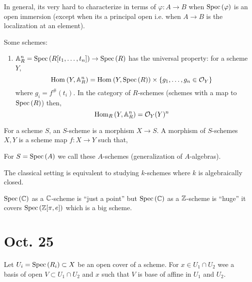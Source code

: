 \documentclass[12pt]{article}
\begin{document}
\begin{rmk}
In general, its very hard to characterize in terms of $\varphi : A \to B$ when $\mathrm{Spec}\left( \varphi \right)$ is an open immersion (except when its a principal open i.e. when $A \to B$ is the localization at an element).
\end{rmk}

\begin{example}
Some schemes:
\begin{enumerate}
\item $\mathbb{A}^n_R = \mathrm{Spec}\left( R[t_1, \dots, t_n] \right) \to \mathrm{Spec}\left( R \right)$ has the universal property: for a scheme $Y$,
\[ \mathrm{Hom}_{} \left( Y, \mathbb{A}^n_R \right) = \mathrm{Hom}_{} \left( Y, \mathrm{Spec}\left( R \right) \right) \times \{ g_1, \dots, g_n \in \mathcal{O}_{Y} \} \]
where $g_i = f^\#(t_i)$. In the category of $R$-schemes (schemes with a map to $\mathrm{Spec}\left( R \right)$) then,
\[ \mathrm{Hom}_{R} \left( Y, \mathbb{A}^n_R \right) = \mathcal{O}_{Y}(Y)^n \]
\end{enumerate}
\end{example}

\begin{defn}
For a scheme $S$, an $S$-scheme is a morphism $X \to S$. A morphism of $S$-schemes $X,Y$ is a scheme map $f : X \to Y$ such that,
\begin{center}
\end{center}
For $S = \mathrm{Spec}\left( A \right)$ we call these $A$-schemes (generalization of $A$-algebras).
\end{defn}

\begin{rmk}
The classical setting is equivalent to studying $k$-schemes where $k$ is algebraically closed.
\end{rmk}

\begin{example}
$\mathrm{Spec}\left( \mathbb{C} \right)$ as a $\mathbb{C}$-scheme is ``just a point'' but $\mathrm{Spec}\left( \mathbb{C} \right)$ as a $\mathbb{Z}$-scheme is ``huge'' it covers $\mathrm{Spec}\left( \mathbb{Z}[\pi, e] \right)$ which is a big scheme.
\end{example}

\section{Oct. 25}

Let $U_i = \mathrm{Spec}\left( R_i \right) \subset X$ be an open cover of a scheme. For $x \in U_1 \cap U_2$ wee a basis of open $V \subset U_1 \cap U_2$ and $x$ such that $V$ is base of affine in $U_1$ and $U_2$.
\end{document}
